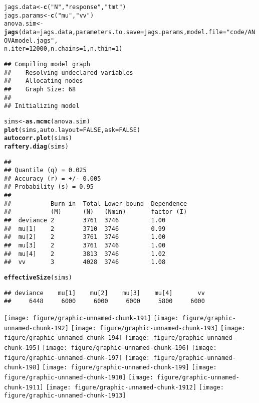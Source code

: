 \documentclass[12pt,letterpaper,oneside]{article}\usepackage{graphicx, color}
\makeatletter
\newcommand{\hlfunctioncall}[1]{\textcolor[rgb]{0.501960784313725,0,0.329411764705882}{\textbf{#1}}}%
\newcommand{\hlstring}[1]{\textcolor[rgb]{0.6,0.6,1}{#1}}%
\newenvironment{kframe}{%
 \def\at@end@of@kframe{}%
 \ifinner\ifhmode%
  \def\at@end@of@kframe{\end{minipage}}%
  \begin{minipage}{\columnwidth}%
 \fi\fi%
 \def\FrameCommand##1{\hskip\@totalleftmargin \hskip-\fboxsep
 \colorbox{shadecolor}{##1}\hskip-\fboxsep
     \hskip-\linewidth \hskip-\@totalleftmargin \hskip\columnwidth}%
 \MakeFramed {\advance\hsize-\width
   \@totalleftmargin\z@ \linewidth\hsize
   \@setminipage}}%
 {\par\unskip\endMakeFramed%
 \at@end@of@kframe}
\newenvironment{knitrout}{}{} %
\makeatother
\begin{document}
\begin{knitrout}\scriptsize
{}\color{fgcolor}\begin{kframe}
\begin{alltt}
jags.data <- \hlfunctioncall{c}(\hlstring{"N"}, \hlstring{"response"}, \hlstring{"tmt"})
jags.params <- \hlfunctioncall{c}(\hlstring{"mu"}, \hlstring{"vv"})
anova.sim <- \hlfunctioncall{jags}(data = jags.data, parameters.to.save = jags.params, model.file = \hlstring{"code/ANOVAmodel.jags"}, 
    n.iter = 12000, n.chains = 1, n.thin = 1)
\end{alltt}
\begin{verbatim}
## Compiling model graph
##    Resolving undeclared variables
##    Allocating nodes
##    Graph Size: 68
## 
## Initializing model
\end{verbatim}
\begin{alltt}
sims <- \hlfunctioncall{as.mcmc}(anova.sim)
\hlfunctioncall{plot}(sims, auto.layout = FALSE, ask = FALSE)
\hlfunctioncall{autocorr.plot}(sims)
\hlfunctioncall{raftery.diag}(sims)
\end{alltt}
\begin{verbatim}
## 
## Quantile (q) = 0.025
## Accuracy (r) = +/- 0.005
## Probability (s) = 0.95 
##                                                 
##           Burn-in  Total Lower bound  Dependence
##           (M)      (N)   (Nmin)       factor (I)
##  deviance 2        3761  3746         1.00      
##  mu[1]    2        3710  3746         0.99      
##  mu[2]    2        3761  3746         1.00      
##  mu[3]    2        3761  3746         1.00      
##  mu[4]    2        3813  3746         1.02      
##  vv       3        4028  3746         1.08
\end{verbatim}
\begin{alltt}
\hlfunctioncall{effectiveSize}(sims)
\end{alltt}
\begin{verbatim}
## deviance    mu[1]    mu[2]    mu[3]    mu[4]       vv 
##     6448     6000     6000     6000     5800     6000
\end{verbatim}
\end{kframe}

{\centering \texttt{[image: figure/graphic-unnamed-chunk-191]} 
\texttt{[image: figure/graphic-unnamed-chunk-192]} 
\texttt{[image: figure/graphic-unnamed-chunk-193]} 
\texttt{[image: figure/graphic-unnamed-chunk-194]} 
\texttt{[image: figure/graphic-unnamed-chunk-195]} 
\texttt{[image: figure/graphic-unnamed-chunk-196]} 
\texttt{[image: figure/graphic-unnamed-chunk-197]} 
\texttt{[image: figure/graphic-unnamed-chunk-198]} 
\texttt{[image: figure/graphic-unnamed-chunk-199]} 
\texttt{[image: figure/graphic-unnamed-chunk-1910]} 
\texttt{[image: figure/graphic-unnamed-chunk-1911]} 
\texttt{[image: figure/graphic-unnamed-chunk-1912]} 
\texttt{[image: figure/graphic-unnamed-chunk-1913]} 

}
\end{knitrout}
\end{document}
